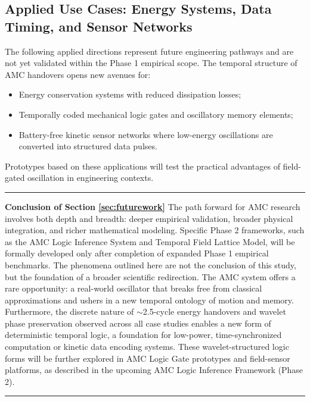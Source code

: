 \documentclass[10pt,aps,pre,onecolumn,superscriptaddress,notitlepage]{revtex4-2}
\begin{document}
\subsection{Applied Use Cases: Energy Systems, Data Timing, and Sensor Networks}
The following applied directions represent future engineering pathways and are not yet validated within the Phase 1 empirical scope. The temporal structure of AMC handovers opens new avenues for:
\begin{itemize}
    \item Energy conservation systems with reduced dissipation losses;
    \item Temporally coded mechanical logic gates and oscillatory memory elements;
    \item Battery-free kinetic sensor networks where low-energy oscillations are converted into structured data pulses.
\end{itemize}

Prototypes based on these applications will test the practical advantages of field-gated oscillation in engineering contexts. 
\vspace{1em}
\hrule
\vspace{1em}
\textbf{Conclusion of Section \ref{sec:futurework}
}
The path forward for AMC research involves both depth and breadth: deeper empirical validation, broader physical integration, and richer mathematical modeling. Specific Phase 2 frameworks, such as the AMC Logic Inference System and Temporal Field Lattice Model, will be formally developed only after completion of expanded Phase 1 empirical benchmarks. The phenomena outlined here are not the conclusion of this study, but the foundation of a broader scientific redirection. The AMC system offers a rare opportunity: a real-world oscillator that breaks free from classical approximations and ushers in a new temporal ontology of motion and memory.  
Furthermore, the discrete nature of $\sim$2.5-cycle energy handovers and wavelet phase preservation observed across all case studies enables a new form of deterministic temporal logic, a foundation for low-power, time-synchronized computation or kinetic data encoding systems. These wavelet-structured logic forms will be further explored in AMC Logic Gate prototypes and field-sensor platforms, as described in the upcoming AMC Logic Inference Framework (Phase 2). 
\vspace{1em}
\hrule
\vspace{1em}

\clearpage
\end{document}

